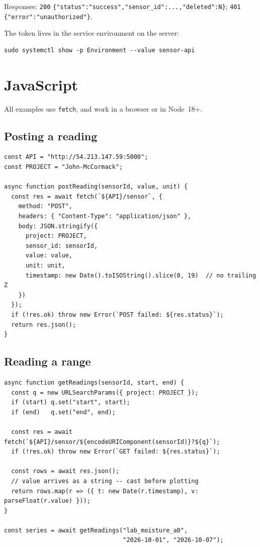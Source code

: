 \documentclass[11pt,a4paper]{article}
\begin{document}
\noindent Responses: \texttt{200}
\texttt{\{"status":"success","sensor\_id":...,"deleted":N\}};
\texttt{401} \texttt{\{"error":"unauthorized"\}}.

The token lives in the service environment on the server:

\begin{lstlisting}
sudo systemctl show -p Environment --value sensor-api
\end{lstlisting}

\section{JavaScript}

All examples use \texttt{fetch}, and work in a browser or in Node~18+.

\subsection{Posting a reading}
\begin{lstlisting}[style=js]
const API = "http://54.213.147.59:5000";
const PROJECT = "John-McCormack";

async function postReading(sensorId, value, unit) {
  const res = await fetch(`${API}/sensor`, {
    method: "POST",
    headers: { "Content-Type": "application/json" },
    body: JSON.stringify({
      project: PROJECT,
      sensor_id: sensorId,
      value: value,
      unit: unit,
      timestamp: new Date().toISOString().slice(0, 19)  // no trailing Z
    })
  });
  if (!res.ok) throw new Error(`POST failed: ${res.status}`);
  return res.json();
}
\end{lstlisting}

\subsection{Reading a range}
\begin{lstlisting}[style=js]
async function getReadings(sensorId, start, end) {
  const q = new URLSearchParams({ project: PROJECT });
  if (start) q.set("start", start);
  if (end)   q.set("end", end);

  const res = await fetch(`${API}/sensor/${encodeURIComponent(sensorId)}?${q}`);
  if (!res.ok) throw new Error(`GET failed: ${res.status}`);

  const rows = await res.json();
  // value arrives as a string -- cast before plotting
  return rows.map(r => ({ t: new Date(r.timestamp), v: parseFloat(r.value) }));
}

const series = await getReadings("lab_moisture_a0",
                                 "2026-10-01", "2026-10-07");
\end{lstlisting}
\end{document}
